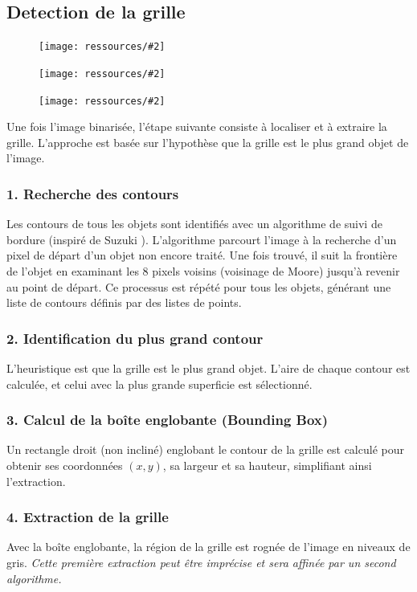 \documentclass{article}
\newcommand{\stepimage}[3][0.3\textwidth]{%
  \minipage{#1}
    \texttt{[image: ressources/\#2]}
    \caption{#3}
  \endminipage\hfill
}
\begin{document}
\subsection{Detection de la grille}
\begin{figure}[!htb]
    \stepimage[0.30\textwidth]{image_1_step_05_grid_extraction.png}{}
    \stepimage[0.30\textwidth]{image_2_step_05_grid_extraction.png}{}
    \stepimage[0.26\textwidth]{image_3_step_05_grid_extraction.png}{}
\end{figure}

Une fois l'image binarisée, l'étape suivante consiste à localiser et à extraire la grille. L'approche est basée sur l'hypothèse que la grille est le plus grand objet de l'image.

\subsubsection{1. Recherche des contours}
Les contours de tous les objets sont identifiés avec un algorithme de suivi de bordure (inspiré de Suzuki \cite{suzuki1985topological}). L'algorithme parcourt l'image à la recherche d'un pixel de départ d'un objet non encore traité. Une fois trouvé, il suit la frontière de l'objet en examinant les 8 pixels voisins (voisinage de Moore) jusqu'à revenir au point de départ. Ce processus est répété pour tous les objets, générant une liste de contours définis par des listes de points.

\subsubsection{2. Identification du plus grand contour}
L'heuristique est que la grille est le plus grand objet. L'aire de chaque contour est calculée, et celui avec la plus grande superficie est sélectionné.

\subsubsection{3. Calcul de la boîte englobante (Bounding Box)}
Un rectangle droit (non incliné) englobant le contour de la grille est calculé pour obtenir ses coordonnées \((x, y)\), sa largeur et sa hauteur, simplifiant ainsi l'extraction.

\subsubsection{4. Extraction de la grille}
Avec la boîte englobante, la région de la grille est rognée de l'image en niveaux de gris. \newline\textcolor{orange}{\HandRight} \textit{Cette première extraction peut être imprécise et sera affinée par un second algorithme.}
\end{document}

